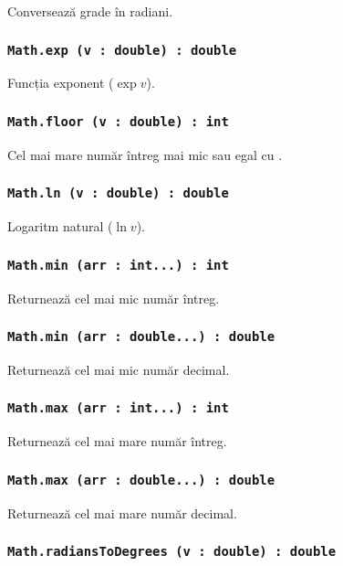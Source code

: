 Conversează grade în radiani.

\subsubsection{\lstinline|Math.exp (v : double) : double|}

Funcția exponent ($\exp{v}$).

\subsubsection{\lstinline|Math.floor (v : double) : int|}

Cel mai mare număr întreg mai mic sau egal cu .

\subsubsection{\lstinline|Math.ln (v : double) : double|}

Logaritm natural ($\ln{v}$).

\subsubsection{\lstinline|Math.min (arr : int...) : int|}

Returnează cel mai mic număr întreg.

\subsubsection{\lstinline|Math.min (arr : double...) : double|}

Returnează cel mai mic număr decimal.

\subsubsection{\lstinline|Math.max (arr : int...) : int|}

Returnează cel mai mare număr întreg.

\subsubsection{\lstinline|Math.max (arr : double...) : double|}

Returnează cel mai mare număr decimal.

\subsubsection{\lstinline|Math.radiansToDegrees (v : double) : double|}

